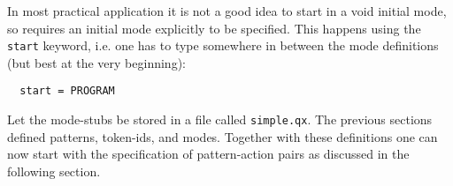 In most practical application it is not a good idea to start in a void initial
mode, so {\quex} requires an initial mode explicitly to be specified. This
happens using the {\tt start} keyword, i.e. one has to type somewhere in
between the mode definitions (but best at the very beginning):

\begin{lstlisting}
  start = PROGRAM
\end{lstlisting}

Let the mode-stubs be stored in a file called {\tt simple.qx}. The previous
sections defined patterns, token-ids, and modes. Together with these
definitions one can now start with the specification of pattern-action pairs
as discussed in the following section.
